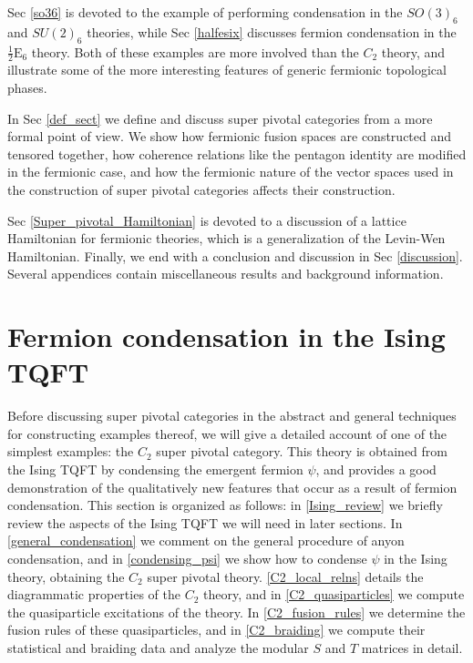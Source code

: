 \documentclass[12pt,a4paper]{article}
\newcommand{\halfesix}{\frac{1}{2}\text{E}_6}
\begin{document}
Sec \ref{so36} is devoted to the example of performing condensation in the $SO(3)_6$ 
and $SU(2)_6$ theories, while Sec \ref{halfesix} discusses fermion condensation in the $
\halfesix$ theory. 
Both of these examples are more involved than the $C_2$ theory, 
and illustrate some of the more interesting features of generic fermionic topological phases. 

In Sec \ref{def_sect} we define and discuss super pivotal categories from a more formal point of view. 
We show how fermionic fusion spaces are constructed and tensored together, how 
coherence relations like the pentagon identity are modified in the fermionic case, 
and how the fermionic nature of the vector spaces used in the construction of super 
pivotal categories affects their construction. 

Sec \ref{Super_pivotal_Hamiltonian} is devoted to a discussion of a lattice Hamiltonian for fermionic theories, which is a generalization of the Levin-Wen Hamiltonian. 
Finally, we end with a conclusion and discussion in Sec \ref{discussion}. 
Several appendices contain miscellaneous results and background information. 



\section{Fermion condensation in the Ising TQFT}  \label{C2_condense_sect}

Before discussing super pivotal categories in the abstract and general techniques for constructing examples thereof,
we will give a detailed account of one of the simplest examples:
the $C_2$ super pivotal category.
This theory 
is obtained from the Ising TQFT by condensing the emergent fermion $\psi$, and provides a good demonstration of the qualitatively new features that occur as a result of fermion condensation. 
This section is organized as follows: in \ref{Ising_review} we briefly review the aspects of the Ising TQFT we will need in later sections. 
In \ref{general_condensation} we comment on the general procedure of anyon condensation, and in \ref{condensing_psi} we show how to condense $\psi$ in the Ising theory, obtaining the $C_2$ super pivotal theory. 
\ref{C2_local_relns} details the diagrammatic properties of the $C_2$ theory, and in \ref{C2_quasiparticles} we compute the quasiparticle excitations of the theory. 
In \ref{C2_fusion_rules} we determine the fusion rules of these quasiparticles, and in \ref{C2_braiding} we compute their statistical and braiding data and analyze the modular $S$ and $T$ matrices in detail. 
\end{document}
